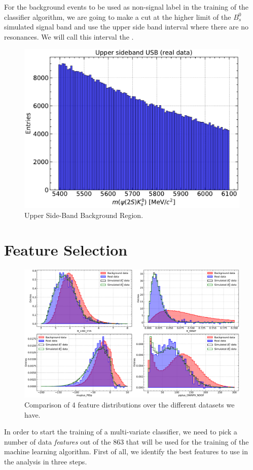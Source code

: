 For the background events to be used as non-signal label in the training of the classifier algorithm, we are going to make a cut at the higher limit of the $B_s^0$ simulated signal band and use the upper side band interval where there are no resonances. We will call this interval the  .

\begin{figure}[H]
	\centering
	\includegraphics[width=0.6\linewidth]{graphs/USB.pdf}
	\caption{Upper Side-Band Background Region.}
    \label{usb}
\end{figure}


\section{Feature Selection}

\begin{figure}[H]
    \centering
    \includegraphics[width=0.8\linewidth]{graphs/features3.pdf}
    \caption{Comparison of 4 feature distributions over the different datasets we have.}
    \label{fig:fea_sel}
\end{figure}

In order to start the training of a multi-variate classifier, we need to pick a number of data \textit{features} out of the 863 that will be used for the training of the machine learning algorithm. First of all, we identify the best features to use in the analysis in three steps.

